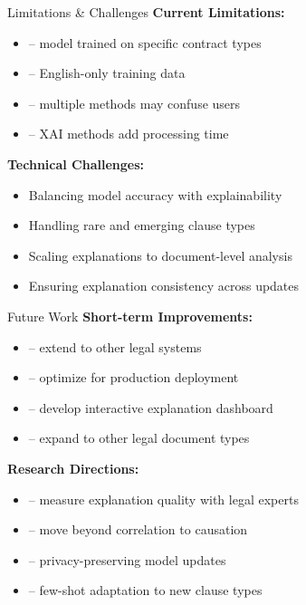 \begin{frame}{Limitations \& Challenges}
\textbf{Current Limitations:}
\begin{itemize}
    \item {} -- model trained on specific contract types
    \item {} -- English-only training data
    \item {} -- multiple methods may confuse users
    \item {} -- XAI methods add processing time
\end{itemize}

\vspace{0.5cm}
\textbf{Technical Challenges:}
\begin{itemize}
    \item Balancing model accuracy with explainability
    \item Handling rare and emerging clause types
    \item Scaling explanations to document-level analysis
    \item Ensuring explanation consistency across updates
\end{itemize}
\end{frame}

\begin{frame}{Future Work}
\textbf{Short-term Improvements:}
\begin{itemize}
    \item {} -- extend to other legal systems
    \item {} -- optimize for production deployment
    \item {} -- develop interactive explanation dashboard
    \item {} -- expand to other legal document types
\end{itemize}

\vspace{0.5cm}
\textbf{Research Directions:}
\begin{itemize}
    \item {} -- measure explanation quality with legal experts
    \item {} -- move beyond correlation to causation
    \item {} -- privacy-preserving model updates
    \item {} -- few-shot adaptation to new clause types
\end{itemize}
\end{frame}

